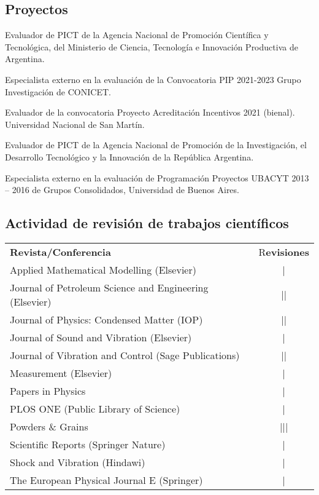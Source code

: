 \subsection{Proyectos}

 Evaluador de PICT de la Agencia Nacional de Promoción Científica y Tecnológica, del Ministerio de Ciencia, Tecnología e 
Innovación Productiva de Argentina.

 Especialista externo en la evaluación de la Convocatoria PIP 2021-2023 Grupo Investigación de CONICET.

 Evaluador de la convocatoria Proyecto Acreditación Incentivos 2021 (bienal). Universidad Nacional de San Martín.

 Evaluador de PICT de la Agencia Nacional de Promoción de la Investigación, el Desarrollo Tecnológico y la Innovación de la República Argentina.

 Especialista externo en la evaluación de Programación Proyectos UBACYT 2013 -- 2016 de Grupos Consolidados, Universidad de Buenos Aires.

\subsection{Actividad de revisión de trabajos científicos}
\begin{tabular}{l c}
    \textbf{Revista/Conferencia} & R\textbf{evisiones} \\
    Applied Mathematical Modelling (Elsevier) & | \\ 
    Journal of Petroleum Science and Engineering (Elsevier) & || \\
    Journal of Physics: Condensed Matter (IOP) & || \\
    Journal of Sound and Vibration (Elsevier) & \cancel{||||} | \\
    Journal of Vibration and Control (Sage Publications) & || \\
    Measurement (Elsevier) &  | \\
    Papers in Physics & | \\
    PLOS ONE (Public Library of Science) & | \\
    Powders \& Grains & ||| \\
    Scientific Reports (Springer Nature) & | \\
    Shock and Vibration (Hindawi) &  | \\
    The European Physical Journal E (Springer) & | 
\end{tabular}

